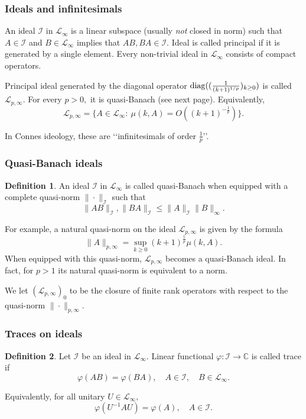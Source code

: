 \documentclass{beamer}
\theoremstyle{definition}
\newtheorem{defi}{Definition}
\begin{document}
\begin{frame}
\frametitle{Ideals and infinitesimals}

An ideal $\mathcal{I}$ in $\mathcal{L}_{\infty}$ is a linear subspace (usually {\it not} closed in norm) such that $A\in\mathcal{I}$ and $B\in\mathcal{L}_{\infty}$ implies that $AB,BA\in\mathcal{I}.$ Ideal is called principal if it is generated by a single element. Every non-trivial ideal in $\mathcal{L}_{\infty}$ consists of compact operators. 

Principal ideal generated by the diagonal operator ${\rm diag}((\frac1{(k+1)^{1/p}})_{k\geq0})$ is called $\mathcal{L}_{p,\infty}.$ For every $p>0,$ it is quasi-Banach (see next page). Equivalently,
$$\mathcal{L}_{p,\infty}=\Big\{A\in\mathcal{L}_{\infty}:\ \mu(k,A)=O((k+1)^{-\frac1p})\Big\}.$$

In Connes ideology, these are \lq\lq infinitesimals of order $\frac1p$\rq\rq.

\end{frame}

\begin{frame}
\frametitle{Quasi-Banach ideals}

\begin{defi} An ideal $\mathcal{I}$ in $\mathcal{L}_{\infty}$ is called quasi-Banach when equipped with a complete quasi-norm $\|\cdot\|_{\mathcal{I}}$ such that
$$\|AB\|_{\mathcal{I}},\|BA\|_{\mathcal{I}}\leq\|A\|_{\mathcal{I}}\|B\|_{\infty}.$$
\end{defi}

For example, a natural quasi-norm on the ideal $\mathcal{L}_{p,\infty}$ is given by the formula
$$\|A\|_{p,\infty}=\sup_{k\geq0}(k+1)^{\frac1p}\mu(k,A).$$
When equipped with this quasi-norm, $\mathcal{L}_{p,\infty}$ becomes a quasi-Banach ideal. In fact, for $p>1$ its natural quasi-norm is equivalent to a norm.

We let $(\mathcal{L}_{p,\infty})_0$ to be the closure of finite rank operators with respect to the quasi-norm $\|\cdot\|_{p,\infty}.$
\end{frame}


\begin{frame}
\frametitle{Traces on ideals}

\begin{defi} Let $\mathcal{I}$ be an ideal in $\mathcal{L}_{\infty}.$ Linear functional $\varphi:\mathcal{I}\to\mathbb{C}$ is called trace if
$$\varphi(AB)=\varphi(BA),\quad A\in\mathcal{I},\quad B\in\mathcal{L}_{\infty}.$$
\end{defi}
Equivalently, for all unitary $U\in\mathcal{L}_{\infty},$
$$\varphi(U^{-1}AU)=\varphi(A),\quad A\in\mathcal{I}.$$
\end{frame}
\end{document}
